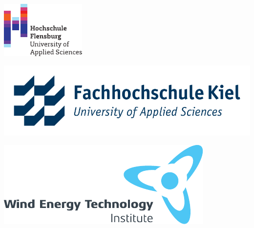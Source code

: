 \begin{titlepage}
\sffamily %

\begin{minipage}[c]{0.25\textwidth}
\includegraphics[width=\textwidth]{Figures/00_other/FUAS.pdf}
\end{minipage}
\begin{minipage}[c]{0.35\textwidth}
\includegraphics[width=\textwidth]{Figures/00_other/FHKiel.jpg}
\end{minipage}
\begin{minipage}[c]{0.35\textwidth}
\includegraphics[width=\textwidth]{Figures/00_other/WETI.pdf}
\end{minipage}

\vspace{4cm}


\end{titlepage}
